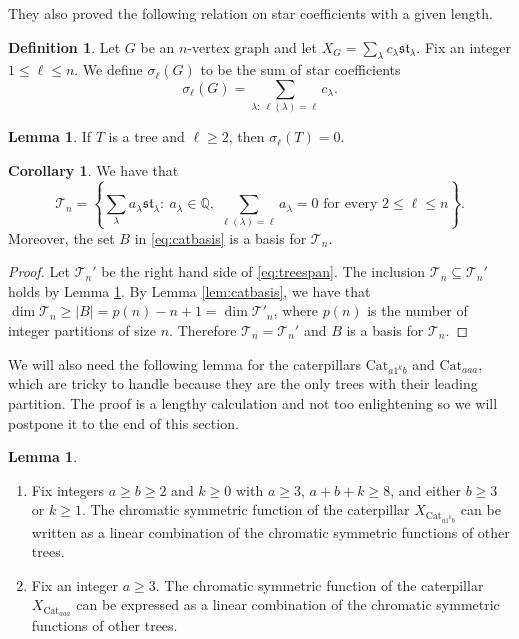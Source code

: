 \documentclass[12pt]{amsart}  %
\theoremstyle{definition}
\newtheorem{lemma}[theorem]{Lemma}
\newtheorem{corollary}[theorem]{Corollary}
\newtheorem{definition}[theorem]{Definition}
\theoremstyle{remark}
\numberwithin{equation}{section}
\begin{document}
They also proved the following relation on star coefficients with a given length.

\begin{definition}
Let $G$ be an $n$-vertex graph and let $X_G=\sum_\lambda c_\lambda\mathfrak{st}_\lambda$. Fix an integer $1\leq\ell\leq n$. We define $\sigma_\ell(G)$ to be the sum of star coefficients
\begin{equation}
\sigma_\ell(G)=\sum_{\lambda: \ \ell(\lambda)=\ell}c_\lambda.
\end{equation}
\end{definition}

\begin{lemma}\label{lem:lengthrelation}
\cite[Lemma 6.10]{chromstar} If $T$ is a tree and $\ell\geq 2$, then $\sigma_\ell(T)=0$.
\end{lemma}

\begin{corollary}\label{cor:catbasis}
We have that
\begin{equation}\label{eq:treespan}
\mathcal T_n=\left\{\sum_\lambda a_\lambda\mathfrak{st}_\lambda: \ a_\lambda\in\mathbb Q, \ \sum_{\ell(\lambda)=\ell}a_\lambda=0\text{ for every }2\leq\ell\leq n\right\}.
\end{equation}
Moreover, the set $B$ in \eqref{eq:catbasis} is a basis for $\mathcal T_n$. 
\end{corollary}

\begin{proof}
Let $\mathcal T_n'$ be the right hand side of \eqref{eq:treespan}. The inclusion $\mathcal T_n\subseteq\mathcal T_n'$ holds by Lemma \ref{lem:lengthrelation}. By Lemma \ref{lem:catbasis}, we have that $\dim\mathcal T_n\geq |B|=p(n)-n+1=\dim\mathcal T'_n$, where $p(n)$ is the number of integer partitions of size $n$. Therefore $\mathcal T_n=\mathcal T_n'$ and $B$ is a basis for $\mathcal T_n$.
\end{proof}

We will also need the following lemma for the caterpillars $\text{Cat}_{a1^kb}$ and $\text{Cat}_{aaa}$, which are tricky to handle because they are the only trees with their leading partition. The proof is a lengthy calculation and not too enlightening so we will postpone it to the end of this section.

\begin{lemma}\hspace{0pt}
\label{lem:ab1k}
\begin{enumerate}
\item Fix integers $a\geq b\geq 2$ and $k\geq 0$ with $a\geq 3$, $a+b+k\geq 8$, and either $b\geq 3$ or $k\geq 1$. The chromatic symmetric function of the caterpillar $X_{\text{Cat}_{a1^kb}}$ can be written as a linear combination of the chromatic symmetric functions of other trees. 
\item Fix an integer $a\geq 3$. The chromatic symmetric function of the caterpillar $X_{\text{Cat}_{aaa}}$ can be expressed as a linear combination of the chromatic symmetric functions of other trees.
\end{enumerate}
\end{lemma}
\end{document}
